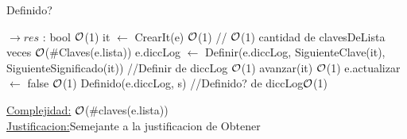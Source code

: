 \begin{Representacion}
\begin{Algoritmos}
	\begin{algorithm}[H]
		\caption{Definido?}
		
		\begin{algorithmic}[1]
			 $\to res$ : bool
			 \Comment $\mathcal{O}$(1)
			\State it $\gets$ CrearIt(e) \Comment $\mathcal{O}$(1)
			 // $\mathcal{O}$(1) cantidad de clavesDeLista veces \Comment $\mathcal{O}$($\#$Claves(e.lista))
			\State e.diccLog $\gets$ Definir(e.diccLog, SiguienteClave(it), SiguienteSignificado(it)) //Definir de diccLog \Comment $\mathcal{O}$(1) 
			\State avanzar(it) \Comment $\mathcal{O}$(1) 
			\EndWhile
			\State e.actualizar $\gets$ false \Comment $\mathcal{O}$(1) 
			\EndIf
			\State Definido(e.diccLog, s) //Definido? de diccLog$\mathcal{O}$(1)
			\EndProcedure
		\end{algorithmic}
		\underline{Complejidad:} $\mathcal{O}$($\#$claves(e.lista))\\
		\underline{Justificacion:}Semejante a la justificacion de Obtener
		
	\end{algorithm}

\end{Algoritmos}
\end{Representacion}